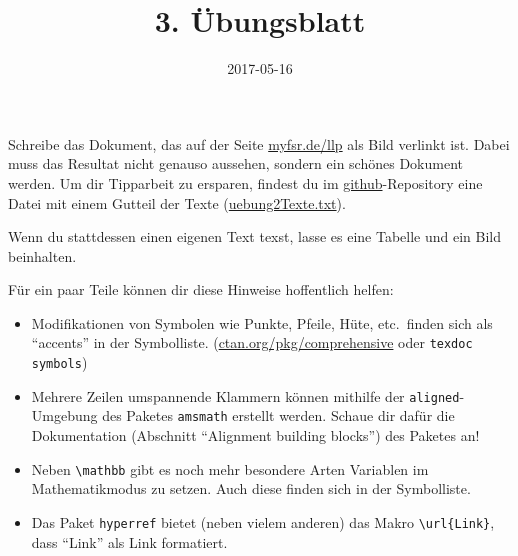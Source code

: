 \documentclass{latex-htw-uebung}
\title{3. Übungsblatt}
\date{2017-05-16}
\begin{document}
Schreibe das Dokument, das auf der Seite \url{myfsr.de/llp} als Bild verlinkt ist. Dabei muss das Resultat nicht genauso aussehen, sondern ein schönes Dokument werden. Um dir Tipparbeit zu ersparen, findest du im \url{github}-Repository eine Datei mit einem Gutteil der Texte (\url{uebung2Texte.txt}).

Wenn du stattdessen einen eigenen Text texst, lasse es eine Tabelle und ein Bild beinhalten.

Für ein paar Teile können dir diese Hinweise hoffentlich helfen:
\begin{itemize}
  \item Modifikationen von Symbolen wie Punkte, Pfeile, Hüte, etc.\ finden sich als \enquote{accents} in der Symbolliste. (\url{ctan.org/pkg/comprehensive} oder \lstinline!texdoc symbols!)
  \item Mehrere Zeilen umspannende Klammern können mithilfe der \lstinline!aligned!-Umgebung des Paketes \lstinline!amsmath! erstellt werden. Schaue dir dafür die Dokumentation (Abschnitt \enquote{Alignment building blocks}) des Paketes an!
  \item Neben \lstinline!\mathbb! gibt es noch mehr besondere Arten Variablen im Mathematikmodus zu setzen. Auch diese finden sich in der Symbolliste.
  \item Das Paket \lstinline!hyperref! bietet (neben vielem anderen) das Makro \lstinline!\url{Link}!, dass \enquote{Link} als Link formatiert.
\end{itemize}
\end{document}
